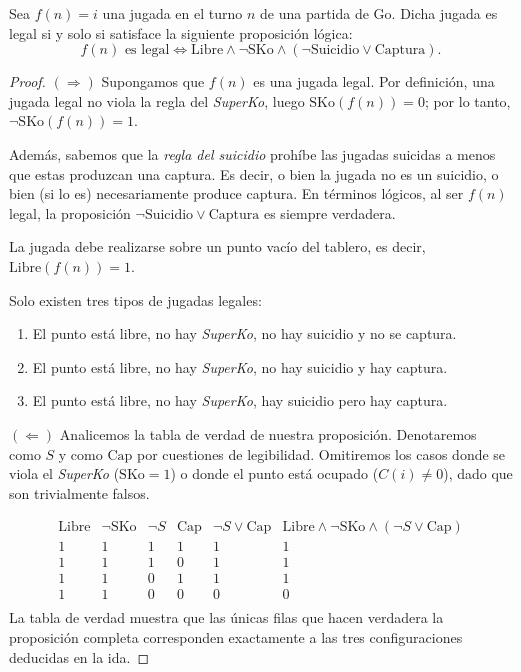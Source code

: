 \begin{theorem}\label{teoremalegal}
	Sea $f(n) = i$ una jugada en el turno $n$ de una partida de Go. Dicha jugada es legal si y solo si satisface la siguiente proposición lógica:
	\[ f(n) \text{ es legal} \iff \text{Libre} \wedge \neg \text{SKo} \wedge (\neg \text{Suicidio} \vee \text{Captura}). \]
\end{theorem}
\begin{proof}
	$(\Rightarrow)$ Supongamos que $f(n)$ es una jugada legal.
	Por definición, una jugada legal no viola la regla del \textit{SuperKo}, luego $\text{SKo}(f(n))=0$; por lo tanto, $\neg\text{SKo}(f(n))=1$.
	
	Además, sabemos que la \textit{regla del suicidio} prohíbe las jugadas suicidas a menos que estas produzcan una captura. Es decir, o bien la jugada no es un suicidio, o bien (si lo es) necesariamente produce captura. En términos lógicos, al ser $f(n)$ legal, la proposición $\neg\text{Suicidio} \vee \text{Captura}$ es siempre verdadera.
	
	La jugada debe realizarse sobre un punto vacío del tablero, es decir, $\text{Libre}(f(n))=1$.
	
	Solo existen tres tipos de jugadas legales:
	\begin{enumerate}
		\item El punto está libre, no hay \textit{SuperKo}, no hay suicidio y no se captura.
		\item El punto está libre, no hay \textit{SuperKo}, no hay suicidio y hay captura.
		\item El punto está libre, no hay \textit{SuperKo}, hay suicidio pero hay captura.
	\end{enumerate}
	
	$(\Leftarrow)$ Analicemos la tabla de verdad de nuestra proposición. Denotaremos  como $S$ y  como $\text{Cap}$ por cuestiones de legibilidad. Omitiremos los casos donde se viola el \textit{SuperKo} ($\text{SKo}=1$) o donde el punto está ocupado ($C(i) \neq 0$), dado que son trivialmente falsos.
	
	\[
	\begin{array}{c|c|c|c|c|c}
		\text{Libre} & \neg \text{SKo} & \neg S & \text{Cap} & \neg S \vee \text{Cap} & \text{Libre} \wedge \neg \text{SKo} \wedge (\neg S \vee \text{Cap}) \\ 
		\hline 
		1 & 1 & 1 & 1 & 1 & 1 \\
		1 & 1 & 1 & 0 & 1 & 1 \\
		1 & 1 & 0 & 1 & 1 & 1 \\
		1 & 1 & 0 & 0 & 0 & 0 \\
	\end{array}
	\]
	La tabla de verdad muestra que las únicas filas que hacen verdadera la proposición completa corresponden exactamente a las tres configuraciones deducidas en la ida.
\end{proof}
